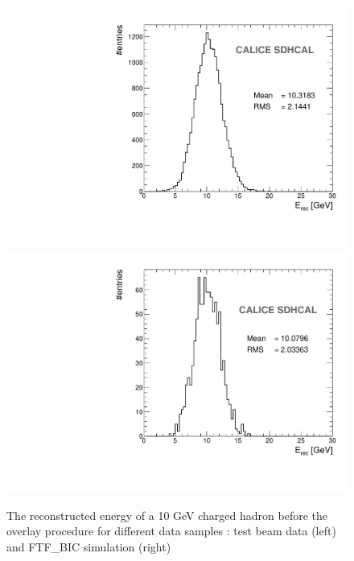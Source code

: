 \documentclass[cits]{JINST}
\begin{document}
\begin{figure}[!h]
  \begin{center}
    \includegraphics[width=0.48\linewidth]{plots/OverlayEvent/OverlayEvent_OverlayCheck_ChBefore_TB.pdf}
    \includegraphics[width=0.48\linewidth]{plots/OverlayEvent/OverlayEvent_OverlayCheck_ChBefore_FTF_BIC.pdf}
  \end{center}
  \caption{\label{OVERLAY_EVENT_MC_CH_EREC_NO_OVERLAY} The reconstructed energy of a 10 GeV charged hadron before the overlay procedure for different data samples : test beam data (left) and FTF\_BIC simulation (right)}
\end{figure}
\end{document}
